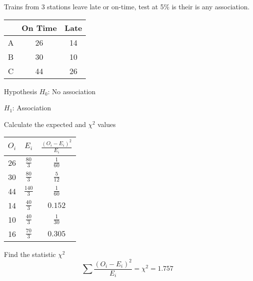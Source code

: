         \begin{example}
        {
            Trains from 3 stations leave late or on-time, test at 5\% is their is any association.\\
        
            \begin{center}
            \begin{tabular}{c|c|c}
                  & On Time & Late \\
                \hline
                A & 26      & 14   \\
                B & 30      & 10   \\
                C & 44      & 26   \\
            \end{tabular}
            \end{center}
        }
        
        
        \begin{step}{Hypothesis}
        $H_0$: No association
        
        $H_1$: Association
        \end{step}
        
        \begin{step}{Calculate the expected and $\chi^2$ values}
        \begin{center}
        \begin{tabular}{c|c|c}
            $O_i$ & $E_i$           & $\displaystyle\frac{(O_i - E_i)^2}{E_i}$   \\[2ex]
            \hline
            \rule{0pt}{3.5ex} 
            26    & $\frac{80}{3}$  & $\frac{1}{60}$                \\[1ex]
            30    & $\frac{80}{3}$  & $\frac{5}{12}$                \\[1ex]
            44    & $\frac{140}{3}$ & $\frac{1}{60}$                \\[1ex]
            14    & $\frac{40}{3}$  & $0.152$                       \\[1ex]
            10    & $\frac{40}{3}$  & $\frac{1}{30}$                \\[1ex]
            16    & $\frac{70}{3}$  & $0.305$                       \\[1ex]
        \end{tabular}
        \end{center}
        \end{step}
    
        \begin{step}{Find the statistic $\chi^2$}
        $$\sum{\frac{(O_i - E_i)^2}{E_i}} = \chi^2 = 1.757$$
        \end{step}
        

\end{example}
